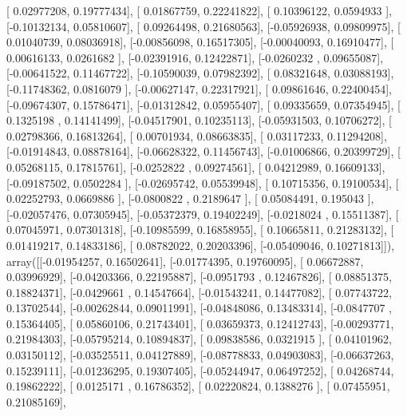 \documentclass{article}
\begin{document}
       [ 0.02977208,  0.19777434],
       [ 0.01867759,  0.22241822],
       [ 0.10396122,  0.0594933 ],
       [-0.10132134,  0.05810607],
       [ 0.09264498,  0.21680563],
       [-0.05926938,  0.09809975],
       [ 0.01040739,  0.08036918],
       [-0.00856098,  0.16517305],
       [-0.00040093,  0.16910477],
       [ 0.00616133,  0.0261682 ],
       [-0.02391916,  0.12422871],
       [-0.0260232 ,  0.09655087],
       [-0.00641522,  0.11467722],
       [-0.10590039,  0.07982392],
       [ 0.08321648,  0.03088193],
       [-0.11748362,  0.0816079 ],
       [-0.00627147,  0.22317921],
       [ 0.09861646,  0.22400454],
       [-0.09674307,  0.15786471],
       [-0.01312842,  0.05955407],
       [ 0.09335659,  0.07354945],
       [ 0.1325198 ,  0.14141499],
       [-0.04517901,  0.10235113],
       [-0.05931503,  0.10706272],
       [ 0.02798366,  0.16813264],
       [ 0.00701934,  0.08663835],
       [ 0.03117233,  0.11294208],
       [-0.01914843,  0.08878164],
       [-0.06628322,  0.11456743],
       [-0.01006866,  0.20399729],
       [ 0.05268115,  0.17815761],
       [-0.0252822 ,  0.09274561],
       [ 0.04212989,  0.16609133],
       [-0.09187502,  0.0502284 ],
       [-0.02695742,  0.05539948],
       [ 0.10715356,  0.19100534],
       [ 0.02252793,  0.0669886 ],
       [-0.0800822 ,  0.2189647 ],
       [ 0.05084491,  0.195043  ],
       [-0.02057476,  0.07305945],
       [-0.05372379,  0.19402249],
       [-0.0218024 ,  0.15511387],
       [ 0.07045971,  0.07301318],
       [-0.10985599,  0.16858955],
       [ 0.10665811,  0.21283132],
       [ 0.01419217,  0.14833186],
       [ 0.08782022,  0.20203396],
       [-0.05409046,  0.10271813]]), array([[-0.01954257,  0.16502641],
       [-0.01774395,  0.19760095],
       [ 0.06672887,  0.03996929],
       [-0.04203366,  0.22195887],
       [-0.0951793 ,  0.12467826],
       [ 0.08851375,  0.18824371],
       [-0.0429661 ,  0.14547664],
       [-0.01543241,  0.14477082],
       [ 0.07743722,  0.13702544],
       [-0.00262844,  0.09011991],
       [-0.04848086,  0.13483314],
       [-0.0847707 ,  0.15364405],
       [ 0.05860106,  0.21743401],
       [ 0.03659373,  0.12412743],
       [-0.00293771,  0.21984303],
       [-0.05795214,  0.10894837],
       [ 0.09838586,  0.0321915 ],
       [ 0.04101962,  0.03150112],
       [-0.03525511,  0.04127889],
       [-0.08778833,  0.04903083],
       [-0.06637263,  0.15239111],
       [-0.01236295,  0.19307405],
       [-0.05244947,  0.06497252],
       [ 0.04268744,  0.19862222],
       [ 0.0125171 ,  0.16786352],
       [ 0.02220824,  0.1388276 ],
       [ 0.07455951,  0.21085169],
\end{document}
